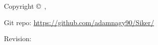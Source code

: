 \pagestyle{plain}
\thispagestyle{empty}
\begin{center}
\textsc{\theauthor}

\textsc{\thetitle}
\end{center}

\newpage\thispagestyle{empty}

\noindent Copyright \copyright~\theauthor, \thedate

\vspace{1cm}
\noindent Git repo: \href{https://github.com/adamnagy90/Siker/}{https://github.com/adamnagy90/Siker/}

\noindent Revision: \gitVer{}

\maketitle
\newpage\thispagestyle{empty}

\cleardoublepage
\thispagestyle{empty}
\setcounter{page}{5}
\tableofcontents
